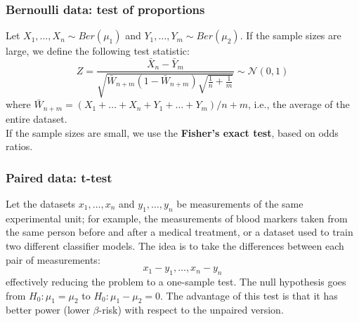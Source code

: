 \subsubsection{Bernoulli data: test of proportions}
Let $X_1, \ldots, X_n \sim Ber(\mu_1)$ and $Y_1, \ldots, Y_m \sim Ber(\mu_2)$. If the sample sizes are large, we define the following test statistic:
\begin{equation*}
    Z = \frac{\bar{X}_n - \bar{Y}_m}{\sqrt{\bar{W}_{n+m} (1 - \bar{W}_{n+m}) \sqrt{\frac{1}{n} + \frac{1}{m}}}} \sim \mathcal{N}(0,1)
\end{equation*}
where $\bar{W}_{n+m} = (X_1 + \ldots + X_n + Y_1 + \ldots + Y_m) / n+m$, i.e., the average of the entire dataset. \\
If the sample sizes are small, we use the \textbf{Fisher's exact test}, based on odds ratios.

\subsubsection{Paired data: t-test}
Let the datasets $x_1, \ldots, x_n$ and $y_1, \ldots, y_n$ be measurements of the same experimental unit; for example, the measurements of blood markers taken from the same person before and after a medical treatment, or a dataset used to train two different classifier models. The idea is to take the differences between each pair of measurements:
\begin{equation*}
    x_1 - y_1, \ldots, x_n - y_n
\end{equation*}
effectively reducing the problem to a one-sample test. The null hypothesis goes from $H_0 : \mu_1 = \mu_2$ to $H_0 : \mu_1 - \mu_2 = 0$. The advantage of this test is that it has better power (lower $\beta$-risk) with respect to the unpaired version.

